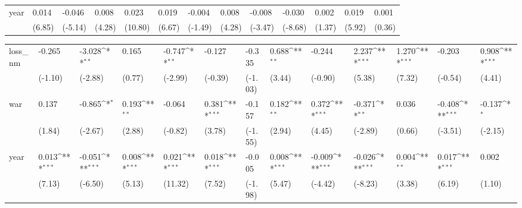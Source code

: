 \begin{tabular}{p{1.5cm} p{1.7cm} p{1.7cm} p{1.7cm} p{1.7cm} p{1.7cm} p{1.7cm} p{1.7cm} p{1.7cm} p{1.7cm} p{1.7cm} p{1.7cm} p{1.7cm}}
year            &    0.014\sym{***}&   -0.046\sym{***}&    0.008\sym{***}&    0.023\sym{***}&    0.019\sym{***}&   -0.004         &    0.008\sym{***}&   -0.008\sym{**} &   -0.030\sym{***}&    0.002         &    0.019\sym{***}&    0.001         \\
                &   (6.85)         &  (-5.14)         &   (4.28)         &  (10.80)         &   (6.67)         &  (-1.49)         &   (4.28)         &  (-3.47)         &  (-8.68)         &   (1.37)         &   (5.92)         &   (0.36)         \\
\end{tabular}
\def\sym#1{\ifmmode^{#1}\else\(^{#1}\)\fi}
\begin{tabular}{p{1.5cm} p{1.7cm} p{1.7cm} p{1.7cm} p{1.7cm} p{1.7cm} p{1.7cm} p{1.7cm} p{1.7cm} p{1.7cm} p{1.7cm} p{1.7cm} p{1.7cm}}
\hline
loss\_nm         &   -0.265         &   -3.028\sym{**} &    0.165         &   -0.747\sym{**} &   -0.127         &   -0.335         &    0.688\sym{**} &   -0.244         &    2.237\sym{***}&    1.270\sym{***}&   -0.203         &    0.908\sym{***}\\
                &  (-1.10)         &  (-2.88)         &   (0.77)         &  (-2.99)         &  (-0.39)         &  (-1.03)         &   (3.44)         &  (-0.90)         &   (5.38)         &   (7.32)         &  (-0.54)         &   (4.41)         \\
war             &    0.137         &   -0.865\sym{*}  &    0.193\sym{**} &   -0.064         &    0.381\sym{***}&   -0.157         &    0.182\sym{**} &    0.372\sym{***}&   -0.371\sym{**} &    0.036         &   -0.408\sym{***}&   -0.137\sym{*}  \\
                &   (1.84)         &  (-2.67)         &   (2.88)         &  (-0.82)         &   (3.78)         &  (-1.55)         &   (2.94)         &   (4.45)         &  (-2.89)         &   (0.66)         &  (-3.51)         &  (-2.15)         \\
year            &    0.013\sym{***}&   -0.051\sym{***}&    0.008\sym{***}&    0.021\sym{***}&    0.018\sym{***}&   -0.005         &    0.008\sym{***}&   -0.009\sym{***}&   -0.026\sym{***}&    0.004\sym{**} &    0.017\sym{***}&    0.002         \\
                &   (7.13)         &  (-6.50)         &   (5.13)         &  (11.32)         &   (7.52)         &  (-1.98)         &   (5.47)         &  (-4.42)         &  (-8.23)         &   (3.38)         &   (6.19)         &   (1.10)         \\
\end{tabular}
